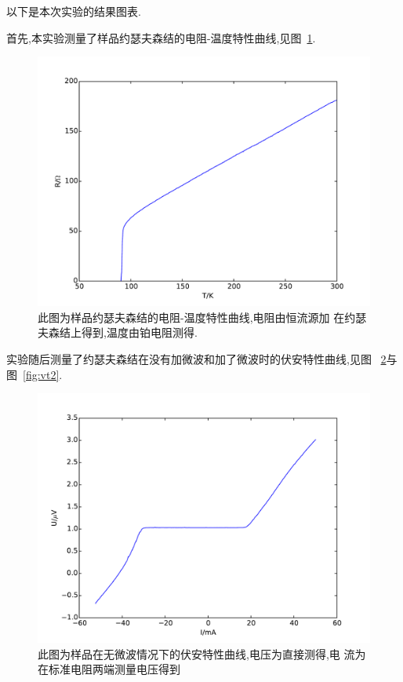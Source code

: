 \documentclass[aps,pre,12pt,preprint,onecolumn,showpacs,showkeys]{revtex4-1}
\begin{document}
以下是本次实验的结果图表.

首先,本实验测量了样品约瑟夫森结的电阻-温度特性曲线,见图~\ref{fig:rt1}.
\begin{figure}[Htbp]
  \centering
\includegraphics[width=\textwidth]{rt1.pdf}
\caption{\label{fig:rt1}此图为样品约瑟夫森结的电阻-温度特性曲线,电阻由恒流源加
    在约瑟夫森结上得到,温度由铂电阻测得.}
\end{figure}

实验随后测量了约瑟夫森结在没有加微波和加了微波时的伏安特性曲线,见图
~\ref{fig:vt1}与图~\ref{fig:vt2}.
\begin{figure}[Htbp]
  \centering
\includegraphics[width=\textwidth]{vt1.pdf}
\caption{\label{fig:vt1}此图为样品在无微波情况下的伏安特性曲线,电压为直接测得,电
流为在标准电阻两端测量电压得到}
\end{figure}
\end{document}
